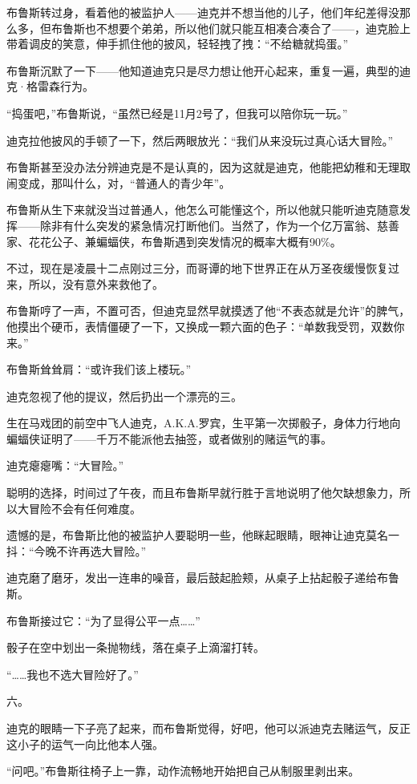 \documentclass[../main]{subfiles}
\begin{document}
布鲁斯转过身，看着他的被监护人——迪克并不想当他的儿子，他们年纪差得没那么多，但布鲁斯也不想要个弟弟，所以他们就只能互相凑合凑合了——，迪克脸上带着调皮的笑意，伸手抓住他的披风，轻轻拽了拽：“不给糖就捣蛋。”

布鲁斯沉默了一下——他知道迪克只是尽力想让他开心起来，重复一遍，典型的迪克·格雷森行为。

“捣蛋吧，”布鲁斯说，“虽然已经是11月2号了，但我可以陪你玩一玩。”

迪克拉他披风的手顿了一下，然后两眼放光：“我们从来没玩过真心话大冒险。”

布鲁斯甚至没办法分辨迪克是不是认真的，因为这就是迪克，他能把幼稚和无理取闹变成，那叫什么，对，“普通人的青少年”。

布鲁斯从生下来就没当过普通人，他怎么可能懂这个，所以他就只能听迪克随意发挥——除非有什么突发的紧急情况打断他们。当然了，作为一个亿万富翁、慈善家、花花公子、兼蝙蝠侠，布鲁斯遇到突发情况的概率大概有90\%。

不过，现在是凌晨十二点刚过三分，而哥谭的地下世界正在从万圣夜缓慢恢复过来，所以，没有意外来救他了。

布鲁斯哼了一声，不置可否，但迪克显然早就摸透了他“不表态就是允许”的脾气，他摸出个硬币，表情僵硬了一下，又换成一颗六面的色子：“单数我受罚，双数你来。”

布鲁斯耸耸肩：“或许我们该上楼玩。”

迪克忽视了他的提议，然后扔出一个漂亮的三。

生在马戏团的前空中飞人迪克，A.K.A.罗宾，生平第一次掷骰子，身体力行地向蝙蝠侠证明了——千万不能派他去抽签，或者做别的赌运气的事。

迪克瘪瘪嘴：“大冒险。”

聪明的选择，时间过了午夜，而且布鲁斯早就行胜于言地说明了他欠缺想象力，所以大冒险不会有任何难度。

遗憾的是，布鲁斯比他的被监护人要聪明一些，他眯起眼睛，眼神让迪克莫名一抖：“今晚不许再选大冒险。”

迪克磨了磨牙，发出一连串的噪音，最后鼓起脸颊，从桌子上拈起骰子递给布鲁斯。

布鲁斯接过它：“为了显得公平一点……”

骰子在空中划出一条抛物线，落在桌子上滴溜打转。

“……我也不选大冒险好了。”

六。

迪克的眼睛一下子亮了起来，而布鲁斯觉得，好吧，他可以派迪克去赌运气，反正这小子的运气一向比他本人强。

“问吧。”布鲁斯往椅子上一靠，动作流畅地开始把自己从制服里剥出来。
\end{document}
